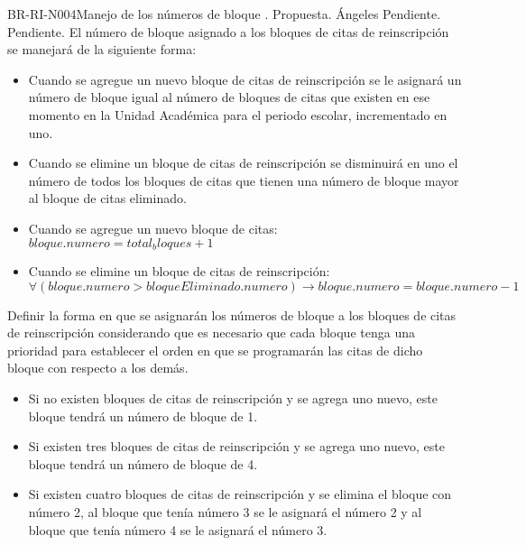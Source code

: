 \begin{BusinessRule}{BR-RI-N004}{Manejo de los números de bloque}
	{\bcDerivation}    %
	{\btTimer}     %
	{\blControlling}    %
	.
	\BRItem[Estado] Propuesta.
	 Ángeles
	 Pendiente.
	 Pendiente.
	\BRItem[Descripción] El número de bloque asignado a los bloques de citas de reinscripción se manejará de la siguiente forma:
	\begin{itemize}
		\item Cuando se agregue un nuevo bloque de citas de reinscripción se le asignará un número de bloque igual al número de bloques de citas que existen en ese momento en la Unidad Académica para el periodo escolar, incrementado en uno.
		\item Cuando se elimine un bloque de citas de reinscripción se disminuirá en uno el número de todos los bloques de citas que tienen una número de bloque mayor al bloque de citas eliminado.
	\end{itemize}
	
	\BRItem[Sentencia] \cdtEmpty
		\begin{itemize}
			\item Cuando se agregue un nuevo bloque de citas: $bloque.numero = total_bloques + 1$
			\item Cuando se elimine un bloque de citas de reinscripción: $$\forall (bloque.numero > bloqueEliminado.numero) \rightarrow bloque.numero = bloque.numero -1$$ 
		\end{itemize}
	\BRItem[Motivación] Definir la forma en que se asignarán los números de bloque a los bloques de citas de reinscripción considerando que es necesario que cada bloque tenga una prioridad para establecer el orden en que se programarán las citas de dicho bloque con respecto a los demás.
	\BRItem[Ejemplo:] 
		\begin{itemize}
			\item Si no existen bloques de citas de reinscripción y se agrega uno nuevo, este bloque tendrá un número de bloque de 1.
			\item Si existen tres bloques de citas de reinscripción y se agrega uno nuevo, este bloque tendrá un número de bloque de 4.
			\item Si existen cuatro bloques de citas de reinscripción y se elimina el bloque con número 2, al bloque que tenía número 3 se le asignará el número 2 y al bloque que tenía número 4 se le asignará el número 3.
		\end{itemize}
\end{BusinessRule}

